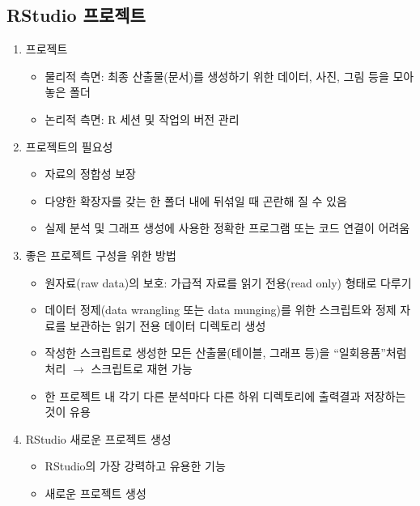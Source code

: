 \documentclass[11pt,a4paper]{book}
\providecommand{\tightlist}{%
  \setlength{\itemsep}{0pt}\setlength{\parskip}{0pt}}
\theoremstyle{definition}
\theoremstyle{definition}
\theoremstyle{definition}
\theoremstyle{remark}
\begin{document}
\subsection{RStudio 프로젝트}\label{rstudio-}

\begin{enumerate}
\def\labelenumi{\arabic{enumi}.}
\tightlist
\item
  프로젝트

  \begin{itemize}
  \tightlist
  \item
    물리적 측면: 최종 산출물(문서)를 생성하기 위한 데이터, 사진, 그림
    등을 모아 놓은 폴더
  \item
    논리적 측면: R 세션 및 작업의 버전 관리
  \end{itemize}
\item
  프로젝트의 필요성

  \begin{itemize}
  \tightlist
  \item
    자료의 정합성 보장
  \item
    다양한 확장자를 갖는 한 폴더 내에 뒤섞일 때 곤란해 질 수 있음
  \item
    실제 분석 및 그래프 생성에 사용한 정확한 프로그램 또는 코드 연결이
    어려움
  \end{itemize}
\item
  좋은 프로젝트 구성을 위한 방법

  \begin{itemize}
  \tightlist
  \item
    원자료(raw data)의 보호: 가급적 자료를 읽기 전용(read only) 형태로
    다루기
  \item
    데이터 정제(data wrangling 또는 data munging)를 위한 스크립트와 정제
    자료를 보관하는 읽기 전용 데이터 디렉토리 생성
  \item
    작성한 스크립트로 생성한 모든 산출물(테이블, 그래프 등)을
    ``일회용품''처럼 처리 \(\rightarrow\) 스크립트로 재현 가능
  \item
    한 프로젝트 내 각기 다른 분석마다 다른 하위 디렉토리에 출력결과
    저장하는 것이 유용
  \end{itemize}
\item
  RStudio 새로운 프로젝트 생성

  \begin{itemize}
  \tightlist
  \item
    RStudio의 가장 강력하고 유용한 기능
  \item
    새로운 프로젝트 생성


\end{itemize}
\end{enumerate}
\end{document}
